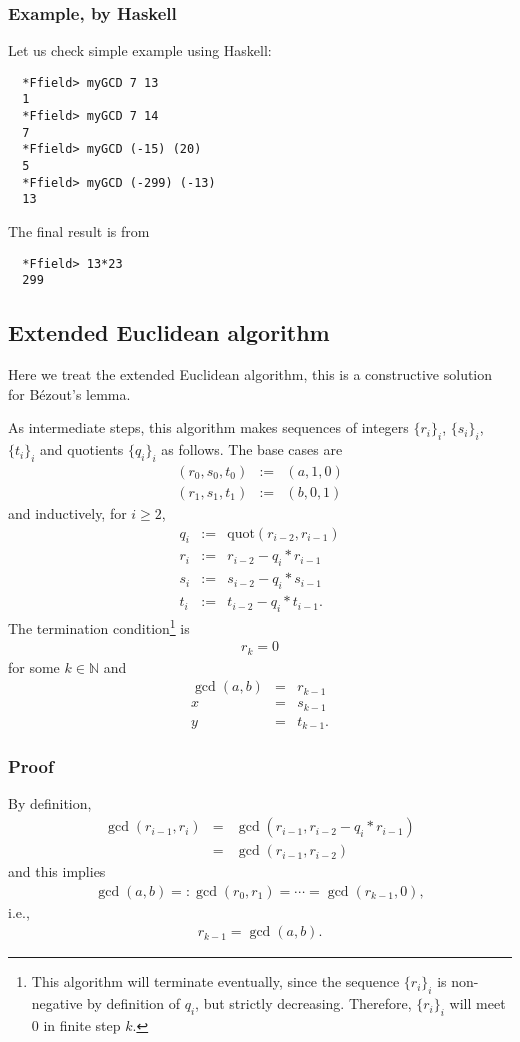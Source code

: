 \documentclass[11pt]{book}
\begin{document}
\subsubsection{Example, by Haskell}
Let us check simple example using Haskell:
\begin{verbatim}
  *Ffield> myGCD 7 13
  1
  *Ffield> myGCD 7 14
  7
  *Ffield> myGCD (-15) (20)
  5
  *Ffield> myGCD (-299) (-13)
  13
\end{verbatim}
The final result is from
\begin{verbatim}
  *Ffield> 13*23
  299
\end{verbatim}

\subsection{Extended Euclidean algorithm}
\label{exGCD}
Here we treat the extended Euclidean algorithm, this is a constructive solution for B\'ezout's lemma.

As intermediate steps, this algorithm makes sequences of integers $\{r_i\}_i$, $\{s_i\}_i$, $\{t_i\}_i$ and quotients $\{q_i\}_i$ as follows.
The base cases are
\begin{eqnarray}
\left(r_0, s_0, t_0 \right) &:=& (a,1,0) \\
\left(r_1, s_1, t_1 \right) &:=& (b,0,1) 
\end{eqnarray}
and inductively, for $i \geq 2$,
\begin{eqnarray}
q_i &:=& \text{quot}(r_{i-2}, r_{i-1}) \\
r_i &:=& r_{i-2} - q_i * r_{i-1} \\
s_i &:=& s_{i-2} - q_i * s_{i-1} \\
t_i &:=& t_{i-2} - q_i * t_{i-1}.
\end{eqnarray}
The termination condition\footnote{
This algorithm will terminate eventually, since the sequence $\{r_i\}_i$ is non-negative by definition of $q_i$, but strictly decreasing.
Therefore, $\{r_i\}_i$ will meet $0$ in finite step $k$.
} is
\begin{eqnarray}
r_k = 0
\end{eqnarray}
for some $k \in \mathbb{N}$ and
\begin{eqnarray}
\gcd(a,b) &=& r_{k-1} \\
x &=& s_{k-1} \\
y &=& t_{k-1}.
\end{eqnarray}

\subsubsection{Proof}
By definition,
\begin{eqnarray}
\gcd(r_{i-1}, r_i) &=& \gcd(r_{i-1}, r_{i-2} - q_i * r_{i-1}) \\
&=& \gcd(r_{i-1}, r_{i-2})
\end{eqnarray}
and this implies 
\begin{eqnarray}
\gcd(a,b) =: \gcd(r_0, r_1) = \cdots = \gcd(r_{k-1}, 0),
\end{eqnarray}
i.e., 
\begin{eqnarray}
r_{k-1} = \gcd(a,b).
\end{eqnarray}
\end{document}
